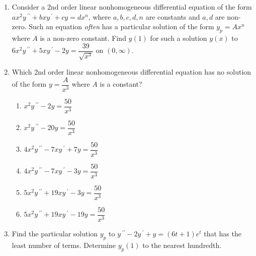 \documentclass{ximera}
\begin{document}
\begin{enumerate}[label=(\arabic*)]

\newpage

\item Consider a 2nd order linear nonhomogeneous differential equation of the form $a x^2 y\,^{\prime\prime}+bx y\,^{\prime}+cy=dx^n$, where $a,b,c,d,n$ are constants and $a,d$ are non-zero. Such an equation \emph{often} has a particular solution of the form $y_p=Ax^n$ where $A$ is a non-zero constant.  Find $y(1)$ for such a solution $y(x)$ to $6x^2 y\,^{\prime\prime}+5xy\,^{\prime}-2y=\dfrac{39}{\sqrt{x^3}}$ on $(0,\infty)$. 

    

\item Which 2nd order linear nonhomogeneous differential equation has no solution of the form $y=\dfrac{A}{x^3}$ where $A$ is a constant?

\begin{enumerate}[label=(\alph*)]
\item $x^2 y\,^{\prime\prime}-2y=\dfrac{50}{x^3}$
\item $x^2 y\,^{\prime\prime}-20y=\dfrac{50}{x^3}$
\item $4x^2 y\,^{\prime\prime}-7xy\,^{\prime}+7y=\dfrac{50}{x^3}$
\item $4x^2 y\,^{\prime\prime}-7xy\,^{\prime}-3y=\dfrac{50}{x^3}$
\item $5x^2 y\,^{\prime\prime}+19xy\,^{\prime}-3y=\dfrac{50}{x^3}$ %
\item $5x^2 y\,^{\prime\prime}+19xy\,^{\prime}-19y=\dfrac{50}{x^3}$
\end{enumerate}



\item Find the particular solution $y_p$ to $y\,^{\prime\prime}-2y\,^{\prime}+y=(6t+1)e^t$ that has the least number of terms.  Determine $y_p(1)$ to the nearest hundredth.



    


\end{enumerate}
\end{document}
